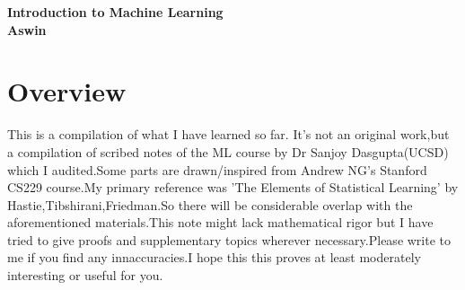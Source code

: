 \documentclass[12pt]{article}
\begin{document}
	
		\enlargethispage{2cm}
		
		\begin{center}
			
			\vspace*{-1cm}
			
			\textbf{\Large Introduction to Machine Learning     }\\[10pt]
			

\textbf{\Large Aswin}\\ [8pt]			
			
			\end{center}
		
\cleardoublepage

\section*{Overview}

This is a compilation of what I have learned so far. It’s not an original work,but a compilation of scribed notes of the ML course by Dr Sanjoy Dasgupta(UCSD) which I audited.Some parts are drawn/inspired from Andrew NG's Stanford CS229 course.My primary reference was 'The Elements of Statistical Learning' by Hastie,Tibshirani,Friedman.So there will be considerable overlap with the aforementioned materials.This note might lack mathematical rigor but I have tried to give proofs and supplementary topics wherever necessary.Please write to me if you find any innaccuracies.I hope this  this proves at least moderately
interesting or useful for you.
	
 
\end{document}
